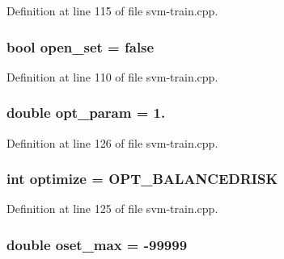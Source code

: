 Definition at line 115 of file svm-\/train.\-cpp.

\hypertarget{svm-train_8cpp_a17843ee1d8102ef588a3f997e827bc70}{
\subsubsection[{open\-\_\-set}]{\setlength{\rightskip}{0pt plus 5cm}bool open\-\_\-set = false}}\label{svm-train_8cpp_a17843ee1d8102ef588a3f997e827bc70}


Definition at line 110 of file svm-\/train.\-cpp.

\hypertarget{svm-train_8cpp_aea4397c2cc729e6e21e3eab9b9a2351e}{
\subsubsection[{opt\-\_\-param}]{\setlength{\rightskip}{0pt plus 5cm}double opt\-\_\-param = 1.}}\label{svm-train_8cpp_aea4397c2cc729e6e21e3eab9b9a2351e}


Definition at line 126 of file svm-\/train.\-cpp.

\hypertarget{svm-train_8cpp_aa33cf9fcdc419d39c5d05fa458bf089a}{
\subsubsection[{optimize}]{\setlength{\rightskip}{0pt plus 5cm}int optimize = {\bf O\-P\-T\-\_\-\-B\-A\-L\-A\-N\-C\-E\-D\-R\-I\-S\-K}}}\label{svm-train_8cpp_aa33cf9fcdc419d39c5d05fa458bf089a}


Definition at line 125 of file svm-\/train.\-cpp.

\hypertarget{svm-train_8cpp_a6a83be17519c65392007b1449d5246e9}{
\subsubsection[{oset\-\_\-max}]{\setlength{\rightskip}{0pt plus 5cm}double oset\-\_\-max = -\/99999}}\label{svm-train_8cpp_a6a83be17519c65392007b1449d5246e9}


